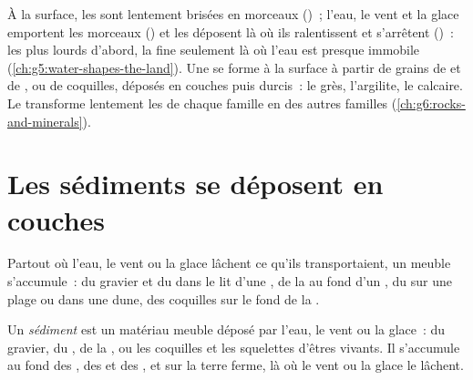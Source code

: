 \begin{recall}
À la surface, les  sont lentement brisées en morceaux
(\emph{})~; l'eau, le vent et la glace emportent les morceaux
(\emph{}) et les déposent là où ils ralentissent et s'arrêtent
(\emph{})~: les plus lourds d'abord, la  fine seulement là où
l'eau est presque immobile (\cref{ch:g5:water-shapes-the-land}). Une
\emph{} se forme à la surface à partir de grains de
 et de , ou de coquilles, déposés en couches puis durcis~: le
grès, l'argilite, le calcaire. Le  transforme lentement les
 de chaque famille en  des autres familles
(\cref{ch:g6:rocks-and-minerals}).
\end{recall}

\section{Les sédiments se déposent en couches}

Partout où l'eau, le vent ou la glace lâchent ce qu'ils transportaient, un
 meuble s'accumule~: du gravier et du  dans le lit d'une ,
de la  au fond d'un , du  sur une plage ou dans une dune, des
coquilles sur le fond de la .

\begin{definition}[Sédiment]\label{def:g7:sediments-and-fossils:sediment}
Un \emph{sédiment} est un matériau meuble déposé
par l'eau, le vent ou la glace~: du gravier, du , de la , ou les
coquilles et les squelettes d'êtres vivants. Il s'accumule au fond des
, des  et des , et sur la terre ferme, là où le vent ou la
glace le lâchent.
\end{definition}

